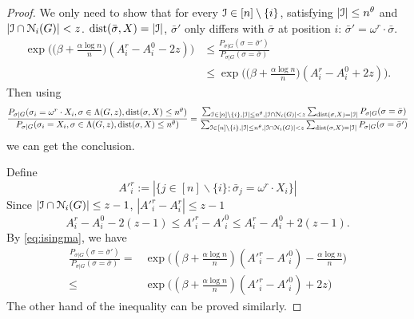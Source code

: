 \documentclass{article}
\begin{document}
\begin{proof}
	We only need to show that for every $\mathcal{I}\in [n]\setminus\{i\}$, satisfying $|\mathcal{I}|\le n^\theta$ and
	$|\mathcal{I} \cap \mathcal{N}_i(G)| < z$. $\operatorname{dist}(\bar{\sigma}, X) = |\mathcal{I}|$, $\bar{\sigma}'$ only differs with $\bar{\sigma}$ at
	position $i$: $\bar{\sigma}' = \omega^r \cdot \bar{\sigma}$.
	\begin{equation} \label{eq:qk}
	\begin{aligned}
	\exp\Big(\big(\beta+\frac{\alpha\log n}{n} \big) (A^r_i-A^0_i - 2z) \Big) & \le 
	\frac{P_{\sigma|G}(\sigma= \bar{\sigma}') } { P_{\sigma|G}(\sigma= \bar{\sigma} ) } \\
	& \le \exp\Big(\big(\beta+\frac{\alpha\log n}{n} \big) (A^r_i-A^0_i + 2z) \Big) .
	\end{aligned}
	\end{equation}
	Then using 
	$$
	\frac{P_{\sigma|G}(\sigma_i= \omega^r \cdot X_i, \sigma\in \Lambda(G,z) ,\operatorname{dist}(\sigma, X) \le n^{\theta} ) } 
	{ P_{\sigma|G}(\sigma_i=X_i, \sigma\in \Lambda(G,z) ,\operatorname{dist}(\sigma, X) \le n^{\theta} ) } 
	= \frac{\sum_{\mathcal{I}\in [n]\setminus\{i\},|\mathcal{I}|\le n^\theta,|\mathcal{I} \cap \mathcal{N}_i(G)| < z}\sum_{\operatorname{dist}(\sigma, X)=|\mathcal{I}|} P_{\sigma|G}(\sigma= \bar{\sigma} ) }
	{\sum_{\mathcal{I}\in [n]\setminus\{i\},|\mathcal{I}|\le n^\theta,|\mathcal{I} \cap \mathcal{N}_i(G)| < z}\sum_{\operatorname{dist}(\sigma, X)=|\mathcal{I}|} P_{\sigma|G}(\sigma = \bar{\sigma}' ) } 
	$$
	we can get the conclusion.
	
	Define
	$$
	A'^r_i := |\{ j \in [n]\backslash \{i\}:  \bar{\sigma}_j = \omega^r \cdot X_i \}|
	$$
	Since $|\mathcal{I}\cap \mathcal{N}_{i}(G)| \le z-1$, $|A'^r_i - A^r_i| \leq z-1$
	\begin{equation} \label{eq:oo}
	A^r_i-A^0_i-2(z-1) \le A'^r_i-A'^0_i\le A^r_i-A^0_i+2(z-1) .
	\end{equation}
	By \eqref{eq:isingma}, we have
	\begin{align*}
	 \frac{P_{\sigma|G}(\sigma=  \bar{\sigma}' ) } { P_{\sigma|G}(\sigma= \bar{\sigma}) }
	= & \exp\Big((\beta+\frac{\alpha\log n }{n})(A'^r_i-A'^0_i)
	-\frac{\alpha\log n}{n}
	\Big)
	\\
	\leq & \exp\Big((\beta+\frac{\alpha\log n }{n})(A'^r_i-A'^0_i)+2z \Big)
	\end{align*}
	The other hand of the inequality can be proved similarly.
\end{proof}
\end{document}
